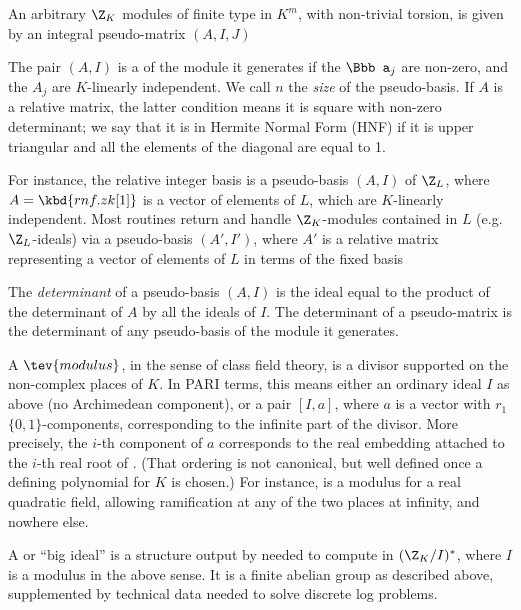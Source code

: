 \item An arbitrary $\Z_K$ modules of finite type in $K^m$, with non-trivial
torsion, is given by an integral pseudo-matrix $(A,I,J)$


\item The pair $(A,I)$ is a  of the module it
generates if the ${\Bbb a_j}$ are non-zero, and the $A_j$ are $K$-linearly
independent. We call $n$ the \emph{size} of the pseudo-basis. If $A$ is a
relative matrix, the latter condition means it is square with non-zero
determinant; we say that it is in Hermite Normal Form (HNF) if it is upper triangular and all the elements of the diagonal
are equal to 1.

\item For instance, the relative integer basis  is a pseudo-basis
$(A,I)$ of $\Z_L$, where $A = \kbd{rnf.zk[1]}$ is a vector of elements of $L$,
which are $K$-linearly independent. Most  routines return and handle
$\Z_K$-modules contained in $L$ (e.g.~$\Z_L$-ideals) via a pseudo-basis
$(A',I')$, where $A'$ is a relative matrix representing a vector of elements of
$L$ in terms of the fixed basis 

\item The \emph{determinant} of a pseudo-basis $(A,I)$ is the ideal
equal to the product of the determinant of $A$ by all the ideals of $I$. The
determinant of a pseudo-matrix is the determinant of any pseudo-basis of the
module it generates.

\label{se:CFT}

A $\tev{modulus}$, in the sense of class field theory, is a divisor supported
on the non-complex places of $K$. In PARI terms, this means either an
ordinary ideal $I$ as above (no Archimedean component), or a pair $[I,a]$,
where $a$ is a vector with $r_1$ $\{0,1\}$-components, corresponding to the
infinite part of the divisor. More precisely, the $i$-th component of $a$
corresponds to the real embedding attached to the $i$-th real root of
. (That ordering is not canonical, but well defined once a
defining polynomial for $K$ is chosen.) For instance, \kbd{[1, [1,1]]} is a
modulus for a real quadratic field, allowing ramification at any of the two
places at infinity, and nowhere else.

A  or ``big ideal'' is a structure output by 
needed to compute in $(\Z_K/I)^*$, where $I$ is a modulus in the above sense.
It is a finite abelian group as described above, supplemented by
technical data needed to solve discrete log problems.


